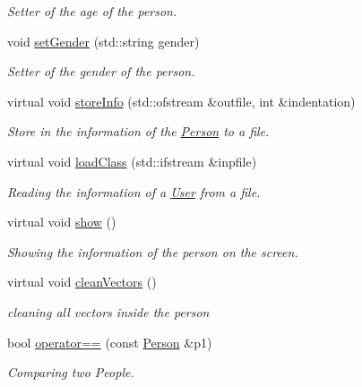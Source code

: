 \begin{DoxyCompactItemize}
\begin{DoxyCompactList}\small\item\em Setter of the age of the person. \end{DoxyCompactList}\item 
void \mbox{\hyperlink{class_person_a7625b600d2c9c0b9c9fc060a6906dac6}{set\+Gender}} (std\+::string gender)
\begin{DoxyCompactList}\small\item\em Setter of the gender of the person. \end{DoxyCompactList}\item 
virtual void \mbox{\hyperlink{class_person_a80f87df3f644706c2ad8fc8b800fdd95}{store\+Info}} (std\+::ofstream \&outfile, int \&indentation)
\begin{DoxyCompactList}\small\item\em Store in the information of the \mbox{\hyperlink{class_person}{Person}} to a file. \end{DoxyCompactList}\item 
virtual void \mbox{\hyperlink{class_person_af07a032df8d56dddade4dc43960b536b}{load\+Class}} (std\+::ifstream \&inpfile)
\begin{DoxyCompactList}\small\item\em Reading the information of a \mbox{\hyperlink{class_user}{User}} from a file. \end{DoxyCompactList}\item 
\mbox{\label{class_person_a2f1231629a6e7e8c83ada57628e80a89}} 
virtual void \mbox{\hyperlink{class_person_a2f1231629a6e7e8c83ada57628e80a89}{show}} ()
\begin{DoxyCompactList}\small\item\em Showing the information of the person on the screen. \end{DoxyCompactList}\item 
\mbox{\label{class_person_ae524672604b31635f981361d604bac7b}} 
virtual void \mbox{\hyperlink{class_person_ae524672604b31635f981361d604bac7b}{clean\+Vectors}} ()
\begin{DoxyCompactList}\small\item\em cleaning all vectors inside the person \end{DoxyCompactList}\item 
bool \mbox{\hyperlink{class_person_aa2fe338cbcf08ee5981dce811fd3a50a}{operator==}} (const \mbox{\hyperlink{class_person}{Person}} \&p1)
\begin{DoxyCompactList}\small\item\em Comparing two People. \end{DoxyCompactList}\end{DoxyCompactItemize}


